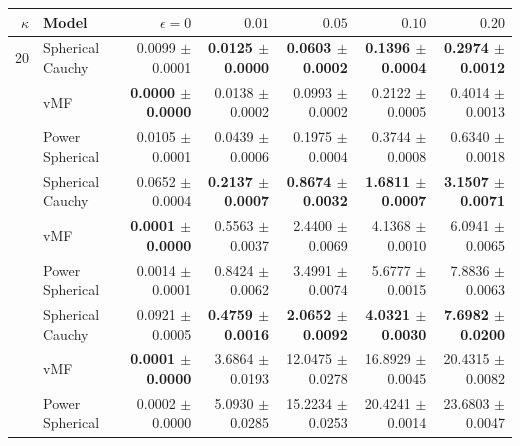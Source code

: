 \begin{tabular}{rlrrrrr}
\toprule
$\kappa$ & Model & $\epsilon=0$ & $0.01$ & $0.05$ & $0.10$ & $0.20$ \\
\midrule
20 & Spherical Cauchy & 0.0099 $\pm$ 0.0001 & \textbf{0.0125 $\pm$ 0.0000} & \textbf{0.0603 $\pm$ 0.0002} & \textbf{0.1396 $\pm$ 0.0004} & \textbf{0.2974 $\pm$ 0.0012} \\
 & vMF & \textbf{0.0000 $\pm$ 0.0000} & 0.0138 $\pm$ 0.0002 & 0.0993 $\pm$ 0.0002 & 0.2122 $\pm$ 0.0005 & 0.4014 $\pm$ 0.0013 \\
 & Power Spherical & 0.0105 $\pm$ 0.0001 & 0.0439 $\pm$ 0.0006 & 0.1975 $\pm$ 0.0004 & 0.3744 $\pm$ 0.0008 & 0.6340 $\pm$ 0.0018 \\
\addlinespace
100 & Spherical Cauchy & 0.0652 $\pm$ 0.0004 & \textbf{0.2137 $\pm$ 0.0007} & \textbf{0.8674 $\pm$ 0.0032} & \textbf{1.6811 $\pm$ 0.0007} & \textbf{3.1507 $\pm$ 0.0071} \\
 & vMF & \textbf{0.0001 $\pm$ 0.0000} & 0.5563 $\pm$ 0.0037 & 2.4400 $\pm$ 0.0069 & 4.1368 $\pm$ 0.0010 & 6.0941 $\pm$ 0.0065 \\
 & Power Spherical & 0.0014 $\pm$ 0.0001 & 0.8424 $\pm$ 0.0062 & 3.4991 $\pm$ 0.0074 & 5.6777 $\pm$ 0.0015 & 7.8836 $\pm$ 0.0063 \\
\addlinespace
500 & Spherical Cauchy & 0.0921 $\pm$ 0.0005 & \textbf{0.4759 $\pm$ 0.0016} & \textbf{2.0652 $\pm$ 0.0092} & \textbf{4.0321 $\pm$ 0.0030} & \textbf{7.6982 $\pm$ 0.0200} \\
 & vMF & \textbf{0.0001 $\pm$ 0.0000} & 3.6864 $\pm$ 0.0193 & 12.0475 $\pm$ 0.0278 & 16.8929 $\pm$ 0.0045 & 20.4315 $\pm$ 0.0082 \\
 & Power Spherical & 0.0002 $\pm$ 0.0000 & 5.0930 $\pm$ 0.0285 & 15.2234 $\pm$ 0.0253 & 20.4241 $\pm$ 0.0014 & 23.6803 $\pm$ 0.0047 \\
\bottomrule
\end{tabular}
